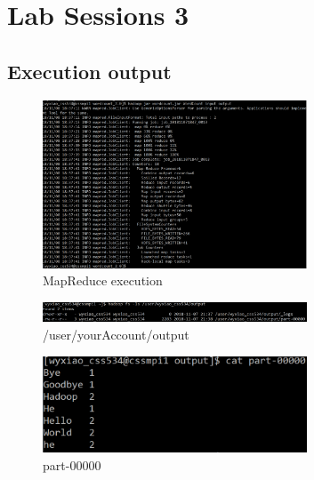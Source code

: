 \documentclass[11pt, letterpaper]{article}
\begin{document}
	
	
	
	
	\section {Lab Sessions 3}
	
	\subsection{Execution output}
	
	\begin{figure}[h]
		\centering
		\includegraphics[width=0.7\textwidth]{lab3out0}
		\caption{MapReduce execution}
	\end{figure}
	
	\begin{figure}[h]
		\centering
		\includegraphics[width=0.7\textwidth]{lab3out1}
		\caption{/user/yourAccount/output}
	\end{figure}
	
	\begin{figure}[h]
		\centering
		\includegraphics[width=0.7\textwidth]{lab3out2}
		\caption{part-00000}
	\end{figure}
\end{document}
